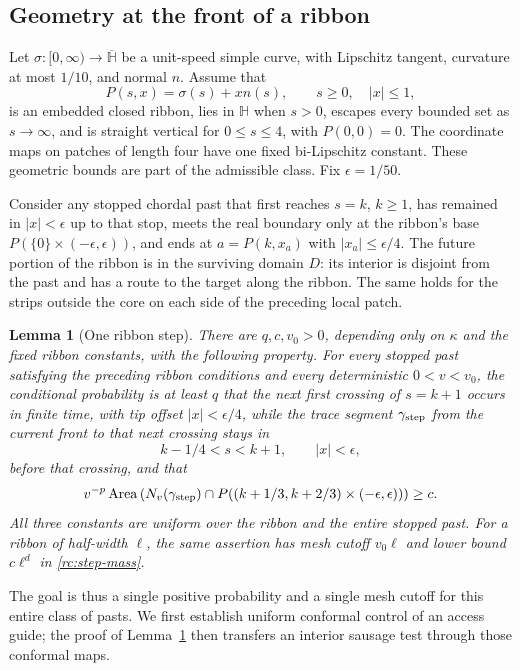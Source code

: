 \documentclass[11pt]{article}
\newtheorem{lemma}[theorem]{Lemma}
\theoremstyle{definition}
\theoremstyle{remark}
\numberwithin{equation}{section}
\begin{document}
\subsection{Geometry at the front of a ribbon}

Let $\sigma:[0,\infty)\to\overline{\mathbb H}$ be a unit-speed simple
curve, with Lipschitz tangent, curvature at most $1/10$, and normal $n$.
Assume that
\[
 P(s,x)=\sigma(s)+xn(s),\qquad s\ge0,\quad |x|\le1,
\]
is an embedded closed ribbon, lies in $\mathbb H$ when $s>0$, escapes
every bounded set as $s\to\infty$, and is straight vertical for
$0\le s\le4$, with $P(0,0)=0$.  The coordinate maps on patches of
length four have one fixed bi-Lipschitz constant. These geometric
bounds are part of the admissible class.  Fix $\epsilon=1/50$.

Consider any stopped chordal past that first reaches $s=k$, $k\ge1$,
has remained in $|x|<\epsilon$ up to that stop, meets the real boundary
only at the ribbon's base $P(\{0\}\times(-\epsilon,\epsilon))$, and ends at
$a=P(k,x_a)$ with $|x_a|\le\epsilon/4$.  The future portion of the
ribbon is in the surviving domain $D$: its interior is disjoint from the
past and has a route to the target along the ribbon.  The same holds for
the strips outside the core on each side of the preceding local patch.

\begin{lemma}[One ribbon step]\label{rc:step}
There are $q,c,v_0>0$, depending only on $\kappa$ and the fixed ribbon
constants, with the following property. For every stopped past
satisfying the preceding ribbon conditions and every deterministic
$0<v<v_0$, the conditional
probability is at least $q$ that the next first crossing of $s=k+1$
occurs in finite time, with tip offset $|x|<\epsilon/4$, while the
trace segment $\gamma_{\rm step}$ from the current
front to that next crossing stays in
\[
 k-1/4<s<k+1,\qquad |x|<\epsilon,
\]
before that crossing, and that
\begin{equation}\label{rc:step-mass}
 v^{-p}\operatorname{Area}
 \left(N_v(\gamma_{\rm step})\cap
   P((k+1/3,k+2/3)\times(-\epsilon,\epsilon))\right)\ge c.
\end{equation}
All three constants are uniform over the ribbon and the entire stopped
past.  For a ribbon of half-width $\ell$, the same assertion has mesh cutoff
$v_0\ell$ and lower bound $c\ell^d$ in \eqref{rc:step-mass}.
\end{lemma}

The goal is thus a single positive probability and a single mesh cutoff
for this entire class of pasts. We first establish uniform conformal
control of an access guide; the proof of Lemma~\ref{rc:step} then
transfers an interior sausage test through those conformal maps.
\end{document}
